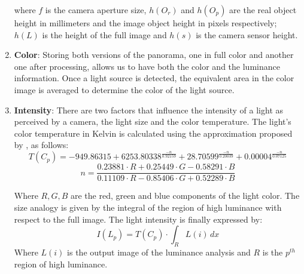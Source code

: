 \begin{enumerate}
where $f$ is the camera aperture size, $h(O_r)$ and $h(O_p)$ are the real object height in millimeters and the image object height in pixels respectively; $h(L)$ is the height of the full image and $h(s)$ is the camera sensor height.

\item \textbf{Color}: Storing both versions of the panorama, one in full color and another one after processing, allows us to have both the color and the luminance information. Once a light source is detected, the equivalent area in the color image is averaged to determine the color of the light source.
\item \textbf{Intensity}: There are two factors that influence the intensity of a light as perceived by a camera, the light size and the color temperature. The light's color temperature in Kelvin is calculated using the approximation proposed by \cite{mccamy1992}, as follows:
\begin{equation}
    T(C_p) = -949.86315 + 6253.80338 ^ {\frac{-n}{0.92159} } + 28.70599 ^{\frac{-n}{0.20039} } + 0.00004 ^ {\frac{-n}{0.07125} }
\end{equation}
\begin{equation}
n = {\frac{0.23881\cdot R + 0.25449\cdot G - 0.58291\cdot B}{0.11109\cdot R - 0.85406\cdot G + 0.52289\cdot B} }
\end{equation}

Where $R, G, B$ are the red, green and blue components of the light color.\newline 
The size analogy is given by the integral of the region of high luminance with respect to the full image. The light intensity is finally expressed by:
\begin{equation}
I(L_p) = T(C_p) \cdot \int_R L(i) \,dx
\end{equation}
Where $L(i)$ is the output image of the luminance analysis and $R$ is the $p^{th}$ region of high luminance.\newline 

\end{enumerate}

